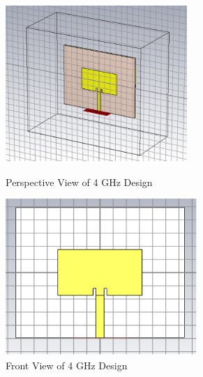 \documentclass[a4paper,12pt]{report}
\begin{document}
\begin{figure}[H]
    \centering
    \begin{minipage}{0.48\textwidth}
        \centering
        \includegraphics[width=\textwidth]{4inset1.png}
        \caption{Perspective View of 4 GHz Design }
        \label{fig:4ghz_inset1}
    \end{minipage}
    \hfill %
    \begin{minipage}{0.48\textwidth}
        \centering
        \includegraphics[width=\textwidth]{4inset2.png}
        \caption{Front View of 4 GHz Design}
        \label{fig:4ghz_inset2}
    \end{minipage}
\end{figure}
\end{document}
